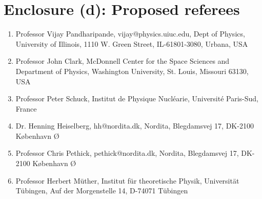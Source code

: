 

\section*{Enclosure (d): Proposed referees}

\begin{enumerate}
\item Professor Vijay Pandharipande, vijay@physics.uiuc.edu,
                    Dept of Physics, University of Illinois, 
                    1110 W. Green Street, IL-61801-3080, Urbana, USA
\item Professor John Clark, McDonnell Center for the Space Sciences
and Department of Physics, Washington University, St. Louis, Missouri 63130,
USA 
\item Professor Peter Schuck, Institut de Physique Nucl\'earie, Universit\'e
Paris-Sud, France
\item Dr. Henning Heiselberg, hh@nordita.dk, Nordita, Blegdamsvej 17, DK-2100
K\o benhavn \O
\item Professor Chris Pethick, pethick@nordita.dk, Nordita, Blegdamsvej 17, DK-2100
K\o benhavn \O

\item Professor Herbert M\"uther, Institut f\"ur theoretische Physik,
Universit\"at T\"ubingen, Auf der Morgenstelle 14, D-74071 T\"ubingen

\end{enumerate}



